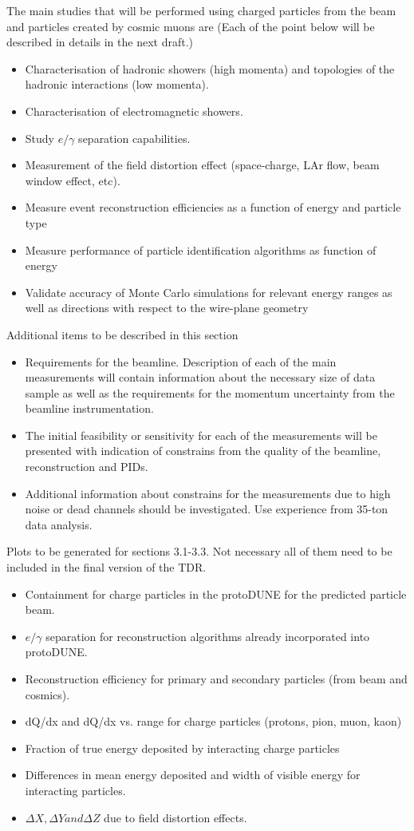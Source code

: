 The main studies that will be performed using charged particles from the beam and particles created by cosmic muons are
(Each of the point below will be described in details in the next draft.)
\begin{itemize}
\item Characterisation of  hadronic showers (high momenta) and  topologies of the hadronic interactions (low momenta).
\item Characterisation of electromagnetic showers.
\item Study $e/\gamma$ separation capabilities.
\item Measurement of the field distortion effect (space-charge, LAr flow, beam window effect, etc).
\item Measure event reconstruction efficiencies as a function of energy and particle type
\item Measure performance of particle identification algorithms as function of energy
\item Validate accuracy of Monte Carlo simulations for relevant energy ranges as well as
directions with respect to the wire-plane geometry
\end{itemize}


Additional items to be described in this section
\begin{itemize}
\item Requirements for the beamline. Description of  each of the main measurements will contain  information about the necessary size of data sample as well as the requirements  for the momentum uncertainty from the beamline instrumentation. 
\item The initial feasibility or sensitivity  for each of the measurements will be presented with indication of constrains from the quality of the beamline, reconstruction and PIDs. 
\item Additional information about constrains for the measurements due to high noise or dead channels should be investigated. Use experience from 35-ton data analysis. 
\end{itemize}

Plots to be generated for  sections 3.1-3.3. Not necessary all of them need to be included in the final version of the TDR.
\begin{itemize}
\item Containment for charge particles in the protoDUNE for the predicted particle beam. 
\item $e/\gamma$ separation for reconstruction algorithms already incorporated into protoDUNE.
\item Reconstruction efficiency for primary and secondary particles (from beam and cosmics).
\item dQ/dx and dQ/dx vs. range for charge particles (protons, pion, muon, kaon)
\item Fraction of true energy deposited by interacting charge particles 
\item Differences in mean energy deposited and width of visible energy  for interacting particles.
\item $\Delta X, \Delta Y and \Delta Z$ due to  field distortion effects. 
\end{itemize}

